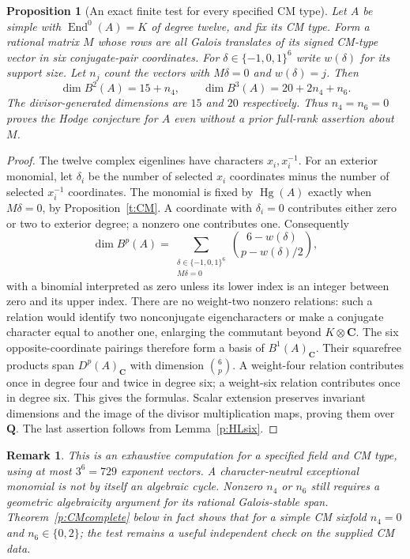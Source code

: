 \documentclass[11pt,reqno]{article}
\theoremstyle{emphasizedplain}
\newtheorem{proposition}[theorem]{Proposition}
\theoremstyle{emphasizeddefinition}
\theoremstyle{emphasizeddefinition}
\newtheorem{remark}[theorem]{Remark}
\DeclareMathOperator{\End}{End}
\DeclareMathOperator{\Hg}{Hg}
\newcommand{\Q}{\mathbf Q}
\newcommand{\C}{\mathbf C}
\begin{document}
\begin{proposition}[An exact finite test for every specified CM type]
\label{p:CMtest}
Let $A$ be simple with $\End^0(A)=K$ of degree twelve, and fix its CM
type. Form a rational matrix $M$ whose rows are all Galois translates
of its signed CM-type vector in six conjugate-pair coordinates. For
$\delta\in\{-1,0,1\}^6$ write $w(\delta)$ for its support size.
Let $n_j$ count the vectors with $M\delta=0$ and $w(\delta)=j$.
Then
\[
 \dim B^2(A)=15+n_4,\qquad
 \dim B^3(A)=20+2n_4+n_6.
\]
The divisor-generated dimensions are $15$ and $20$ respectively.
Thus $n_4=n_6=0$ proves the Hodge conjecture for $A$ even without a
prior full-rank assertion about $M$.
\end{proposition}
\begin{proof}
The twelve complex eigenlines have characters $x_i,x_i^{-1}$.
For an exterior monomial, let $\delta_i$ be the number of selected
$x_i$ coordinates minus the number of selected $x_i^{-1}$ coordinates.
The monomial is fixed by $\Hg(A)$ exactly when $M\delta=0$, by
Proposition~\ref{t:CM}. A coordinate with $\delta_i=0$ contributes
either zero or two to exterior degree; a nonzero one contributes one.
Consequently
\[
 \dim B^p(A)=\sum_{\substack{\delta\in\{-1,0,1\}^6\\M\delta=0}}
 \binom{6-w(\delta)}{p-w(\delta)/2},
\]
with a binomial interpreted as zero unless its lower index is an integer
between zero and its upper index.
There are no weight-two nonzero relations: such a relation would identify
two nonconjugate eigencharacters or make a conjugate character equal to
another one, enlarging the commutant beyond $K\otimes\C$.
The six opposite-coordinate pairings therefore form a basis of
$B^1(A)_\C$. Their squarefree products span $D^p(A)_\C$ with dimension
$\binom6p$. A weight-four relation contributes once in degree four and
twice in degree six; a weight-six relation contributes once in degree six.
This gives the formulas. Scalar extension preserves invariant dimensions
and the image of the divisor multiplication maps, proving them over
$\Q$. The last assertion follows from Lemma~\ref{p:HLsix}.
\end{proof}
\begin{remark}
This is an exhaustive computation for a specified field and CM type,
using at most $3^6=729$ exponent vectors. A character-neutral exceptional
monomial is not by itself an algebraic cycle. Nonzero $n_4$ or $n_6$
still requires a geometric algebraicity argument for its rational
Galois-stable span. Theorem~\ref{p:CMcomplete} below in fact shows
that for a simple CM sixfold $n_4=0$ and $n_6\in\{0,2\}$;
the test remains a useful independent check on the supplied CM data.
\end{remark}
\end{document}
